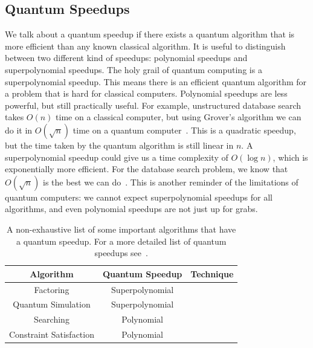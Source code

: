 \documentclass[twocolumn, switch]{article}
\begin{document}
    \subsection{Quantum Speedups}
    We talk about a quantum speedup if there exists a quantum algorithm that is more efficient than any known classical algorithm.
    It is useful to distinguish between two different kind of speedups: polynomial speedups and superpolynomial speedups.
    The holy grail of quantum computing is a superpolynomial speedup.
    This means there is an efficient quantum algorithm for a problem that is hard for classical computers.
    Polynomial speedups are less powerful, but still practically useful.
    For example, unstructured database search takes $O(n)$ time on a classical computer, but using Grover's algorithm we can do it in $O(\sqrt{n})$ time on a quantum computer~\cite{grover1996fast}.
    This is a quadratic speedup, but the time taken by the quantum algorithm is still linear in $n$.
    A superpolynomial speedup could give us a time complexity of $O(\log{n})$, which is exponentially more efficient.
    For the database search problem, we know that $O(\sqrt{n})$ is the best we can do~\cite{bennett1997strengths}.
    This is another reminder of the limitations of quantum computers: we cannot expect superpolynomial speedups for all algorithms, and even polynomial speedups are not just up for grabs.
    
    \begin{table}[ht]
        {\renewcommand{\arraystretch}{1.2}
            \begin{tabularx}{\columnwidth}{c|c|Y}
                \hline
                Algorithm & Quantum Speedup & Technique \\
                \hline
                Factoring & Superpolynomial & \cite{shor-factoring} \\
                Quantum Simulation & Superpolynomial &
                \cite{zalka1998efficient, lloyd1996universal, aspuru2005simulated} \\
                Searching & Polynomial & \cite{grover1996fast} \\
                Constraint Satisfaction & Polynomial & \cite{ambainis2005quantum} \\
                 \hline
            \end{tabularx}
        }
        \caption{A non-exhaustive list of some important algorithms that have a quantum speedup. For a more detailed list of quantum speedups see~\cite{jordan2011quantum}.}
        \label{table:quantum-classic-efficiency}
    \end{table}
\end{document}
